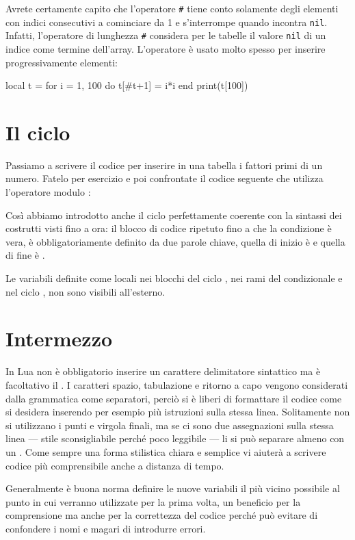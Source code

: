Avrete certamente capito che l'operatore \texttt{\#} tiene conto solamente
degli elementi con indici consecutivi a cominciare da 1 e s'interrompe quando
incontra \texttt{nil}. Infatti, l'operatore di lunghezza \texttt{\#} considera
per le tabelle il valore \texttt{nil} di un indice come termine dell'array.
L'operatore è usato molto spesso per inserire progressivamente elementi:
\begin{lines}
local t = {}
for i = 1, 100 do
    t[#t+1] = i*i
end
print(t[100])
\end{lines}


\section{Il ciclo }
\label{secCicloWhile}

Passiamo a scrivere il codice per inserire in una tabella i fattori primi di un
numero. Fatelo per esercizio e poi confrontate il codice seguente che utilizza
l'operatore modulo \key{\%}:

Così abbiamo introdotto anche il ciclo  perfettamente coerente con
la sintassi dei costrutti visti fino a ora: il blocco di codice ripetuto fino a
che la condizione è vera, è obbligatoriamente definito da due parole chiave,
quella di inizio è  e quella di fine è .

Le variabili definite come locali nei blocchi del ciclo , nei rami del
condizionale  e nel ciclo , non sono visibili all'esterno.


\section{Intermezzo}

In Lua non è obbligatorio inserire un carattere delimitatore sintattico ma è
facoltativo il \key{;}. I caratteri spazio, tabulazione e ritorno a capo vengono
considerati dalla grammatica come separatori, perciò si è liberi di formattare
il codice come si desidera inserendo per esempio più istruzioni sulla stessa
linea. Solitamente non si utilizzano i punti e virgola finali, ma se ci sono due
assegnazioni sulla stessa linea --- stile sconsigliabile perché poco leggibile
--- li si può separare almeno con un \key{;}. Come sempre una forma stilistica
chiara e semplice vi aiuterà a scrivere codice più comprensibile anche a
distanza di tempo.

Generalmente è buona norma definire le nuove variabili il più vicino possibile
al punto in cui verranno utilizzate per la prima volta, un beneficio per la
comprensione ma anche per la correttezza del codice perché può evitare di
confondere i nomi e magari di introdurre errori.


